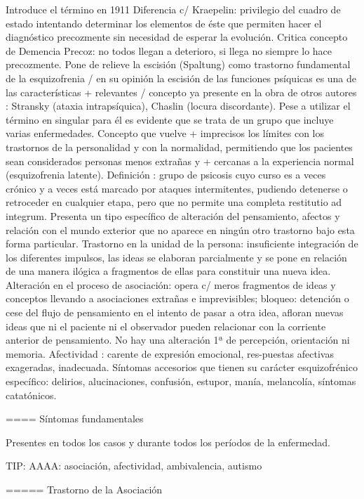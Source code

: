 \documentclass[encares.tex]{subfiles}
\begin{document}
Introduce el término en 1911 Diferencia c/ Kraepelin: privilegio del cuadro de estado intentando determinar los elementos de éste que permiten hacer el diagnóstico precozmente sin necesidad de esperar la evolución. Critica concepto de Demencia Precoz: no todos llegan a deterioro, si llega no siempre lo hace precozmente. Pone de relieve la escisión (Spaltung) como trastorno fundamental de la esquizofrenia / en su opinión la escisión de las funciones psíquicas es una de las características + relevantes / concepto ya presente en la obra de otros autores : Stransky (ataxia intrapsíquica), Chaslin (locura discordante). Pese a utilizar el término en singular para él es evidente que se trata de un grupo que incluye varias enfermedades. Concepto que vuelve + imprecisos los límites con los trastornos de la personalidad y con la normalidad, permitiendo que los pacientes sean considerados personas menos extrañas y + cercanas a la experiencia normal (esquizofrenia latente). 
Definición : grupo de psicosis cuyo curso es a veces crónico y a veces está marcado por ataques intermitentes, pudiendo detenerse o retroceder en cualquier etapa, pero que no permite una completa restitutio ad integrum. Presenta un tipo específico de alteración del pensamiento, afectos y relación con el mundo exterior que no aparece en ningún otro trastorno bajo esta forma particular. Trastorno en la unidad de la persona: insuficiente integración de los diferentes impulsos, las ideas se elaboran parcialmente y se pone en relación de una manera ilógica a fragmentos de ellas para constituir una nueva idea. Alteración en el proceso de asociación: opera c/ meros fragmentos de ideas y conceptos llevando a asociaciones extrañas e imprevisibles; bloqueo: detención o cese del flujo de pensamiento en el intento de pasar a otra idea, afloran nuevas ideas que ni el paciente ni el observador pueden relacionar con la corriente anterior de pensamiento. No hay una alteración 1ª de percepción, orientación ni memoria. Afectividad : carente de expresión emocional, res-puestas afectivas exageradas, inadecuada. Síntomas accesorios que tienen su carácter esquizofrénico específico: delirios, alucinaciones, confusión, estupor, manía, melancolía, síntomas catatónicos.

==== Síntomas fundamentales

Presentes en todos los casos y durante todos los períodos de la enfermedad.

TIP: AAAA: asociación, afectividad, ambivalencia, autismo

===== Trastorno de la Asociación
\end{document}
